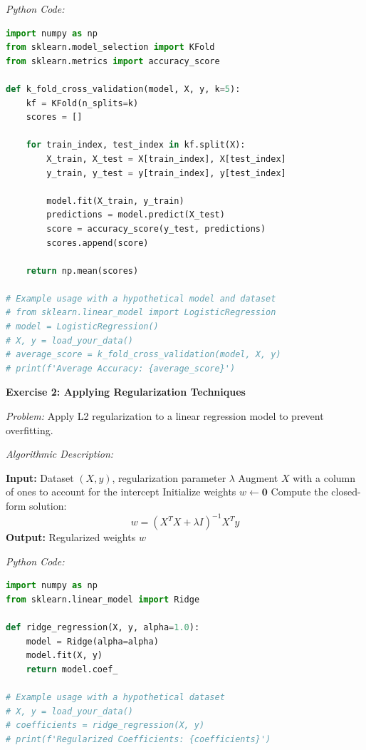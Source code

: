 \documentclass[12pt]{book} %
\begin{document}
\FloatBarrier
\textit{Python Code:}
\begin{lstlisting}[language=Python, caption=K-Fold Cross-Validation]
import numpy as np
from sklearn.model_selection import KFold
from sklearn.metrics import accuracy_score

def k_fold_cross_validation(model, X, y, k=5):
    kf = KFold(n_splits=k)
    scores = []
    
    for train_index, test_index in kf.split(X):
        X_train, X_test = X[train_index], X[test_index]
        y_train, y_test = y[train_index], y[test_index]
        
        model.fit(X_train, y_train)
        predictions = model.predict(X_test)
        score = accuracy_score(y_test, predictions)
        scores.append(score)
    
    return np.mean(scores)

# Example usage with a hypothetical model and dataset
# from sklearn.linear_model import LogisticRegression
# model = LogisticRegression()
# X, y = load_your_data()
# average_score = k_fold_cross_validation(model, X, y)
# print(f'Average Accuracy: {average_score}')
\end{lstlisting}
\FloatBarrier

\textbf{Exercise 2: Applying Regularization Techniques}

\textit{Problem:} Apply L2 regularization to a linear regression model to prevent overfitting.

\textit{Algorithmic Description:}
\begin{algorithm}
\caption{Linear Regression with L2 Regularization (Ridge Regression)}
\begin{algorithmic}[1]
\State \textbf{Input:} Dataset $(X, y)$, regularization parameter $\lambda$
\State Augment $X$ with a column of ones to account for the intercept
\State Initialize weights $w \leftarrow \mathbf{0}$
\State Compute the closed-form solution:
\[
w = (X^TX + \lambda I)^{-1}X^Ty
\]
\State \textbf{Output:} Regularized weights $w$
\end{algorithmic}
\end{algorithm}

\FloatBarrier
\textit{Python Code:}
\begin{lstlisting}[language=Python, caption=Ridge Regression]
import numpy as np
from sklearn.linear_model import Ridge

def ridge_regression(X, y, alpha=1.0):
    model = Ridge(alpha=alpha)
    model.fit(X, y)
    return model.coef_

# Example usage with a hypothetical dataset
# X, y = load_your_data()
# coefficients = ridge_regression(X, y)
# print(f'Regularized Coefficients: {coefficients}')
\end{lstlisting}
\FloatBarrier
\end{document}
